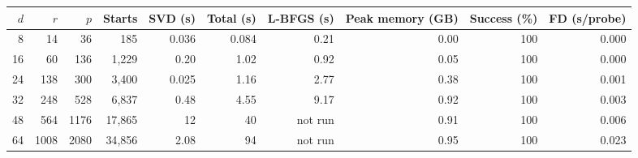 \begin{tabular}{r r r r r r r r r r}
\toprule
$d$ & $r$ & $p$ & Starts & SVD (s) & Total (s) & L-BFGS (s) & Peak memory (GB) & Success (\%) & FD (s/probe)\\
\midrule
8 & 14 & 36 & 185 & 0.036 & 0.084 & 0.21 & 0.00 & 100 & 0.000 \\
16 & 60 & 136 & 1{,}229 & 0.20 & 1.02 & 0.92 & 0.05 & 100 & 0.000 \\
24 & 138 & 300 & 3{,}400 & 0.025 & 1.16 & 2.77 & 0.38 & 100 & 0.001 \\
32 & 248 & 528 & 6{,}837 & 0.48 & 4.55 & 9.17 & 0.92 & 100 & 0.003 \\
48 & 564 & 1176 & 17{,}865 & 12 & 40 & not run & 0.91 & 100 & 0.006 \\
64 & 1008 & 2080 & 34{,}856 & 2.08 & 94 & not run & 0.95 & 100 & 0.023 \\
\bottomrule
\end{tabular}
